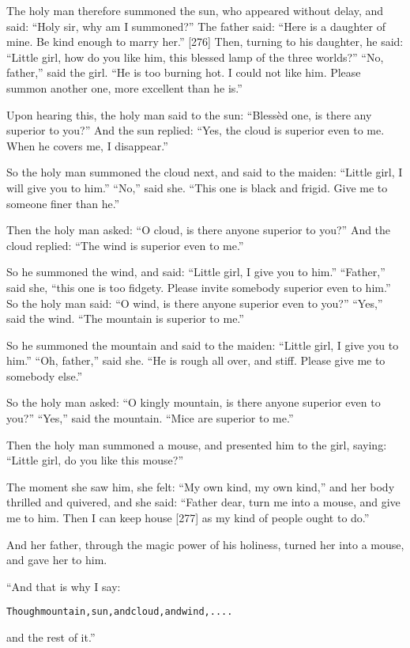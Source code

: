 \documentclass{article}
\renewenvironment{verbatim}{\begin{alltt}\normalfont\begin{centering}}{\end{centering}\end{alltt}}
\begin{document}
The holy man therefore summoned the sun, who appeared without
delay, and said: ``Holy sir, why am I summoned?'' The father said:
``Here is a daughter of mine. Be kind enough to marry her.'' [276]
Then, turning to his daughter, he said:
``Little girl, how do you like him, this blessed lamp of the three worlds?''
``No, father,'' said the girl.
``He is too burning hot. I could not like him. Please summon another one, more excellent than he is.''

Upon hearing this, the holy man said to the sun:
``Blessèd one, is there any superior to you?'' And the sun replied:
``Yes, the cloud is superior even to me. When he covers me, I disappear.''

So the holy man summoned the cloud next, and said to the maiden:
``Little girl, I will give you to him.'' ``No,'' said she.
``This one is black and frigid. Give me to someone finer than he.''

Then the holy man asked:
``O cloud, is there anyone superior to you?'' And the cloud
replied: ``The wind is superior even to me.''

So he summoned the wind, and said:
``Little girl, I give you to him.'' ``Father,'' said she,
``this one is too fidgety. Please invite somebody superior even to him.''
So the holy man said:
``O wind, is there anyone superior even to you?'' ``Yes,'' said the
wind. ``The mountain is superior to me.''

So he summoned the mountain and said to the maiden:
``Little girl, I give you to him.'' ``Oh, father,'' said she.
``He is rough all over, and stiff. Please give me to somebody else.''

So the holy man asked:
``O kingly mountain, is there anyone superior even to you?''
``Yes,'' said the mountain. ``Mice are superior to me.''

Then the holy man summoned a mouse, and presented him to the girl,
saying: ``Little girl, do you like this mouse?''

The moment she saw him, she felt: ``My own kind, my own kind,'' and
her body thrilled and quivered, and she said:
``Father dear, turn me into a mouse, and give me to him. Then I can keep house [277] as my kind of people ought to do.''

And her father, through the magic power of his holiness, turned her
into a mouse, and gave her to him.

“And that is why I say:

\begin{verbatim}
Though mountain, sun, and cloud, and wind, ....
\end{verbatim}
and the rest of it.”
\end{document}
